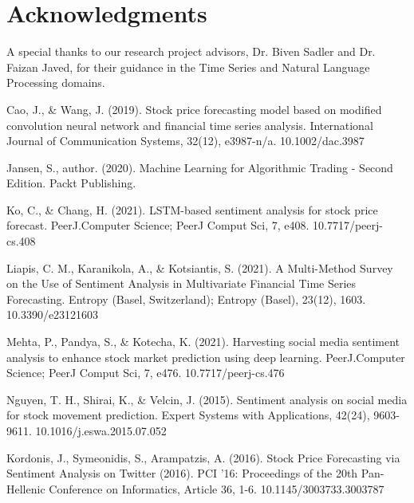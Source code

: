 \documentclass{llncs}
\begin{document}
\section{Acknowledgments}

A special thanks to our research project advisors, Dr. Biven Sadler and Dr. Faizan Javed, for their guidance in the Time Series and Natural Language Processing domains.


%
%
%
% 
% 
%

\newpage

\begin{thebibliography}{8}

\label{ref_article1} 
Cao, J., \& Wang, J. (2019). Stock price forecasting model based on modified convolution neural network and financial time series analysis. International Journal of Communication Systems, 32(12), e3987-n/a. 10.1002/dac.3987

\label{ref_article2} 
Jansen, S., author. (2020). Machine Learning for Algorithmic Trading - Second Edition. Packt Publishing.

\label{ref_article3} 
Ko, C., \& Chang, H. (2021). LSTM-based sentiment analysis for stock price forecast. PeerJ.Computer Science; PeerJ Comput Sci, 7, e408. 10.7717/peerj-cs.408

\label{ref_article4} 
Liapis, C. M., Karanikola, A., \& Kotsiantis, S. (2021). A Multi-Method Survey on the Use of Sentiment Analysis in Multivariate Financial Time Series Forecasting. Entropy (Basel, Switzerland); Entropy (Basel), 23(12), 1603. 10.3390/e23121603

\label{ref_article5} 
Mehta, P., Pandya, S., \& Kotecha, K. (2021). Harvesting social media sentiment analysis to enhance stock market prediction using deep learning. PeerJ.Computer Science; PeerJ Comput Sci, 7, e476. 10.7717/peerj-cs.476

\label{ref_article6} 
Nguyen, T. H., Shirai, K., \& Velcin, J. (2015). Sentiment analysis on social media for stock movement prediction. Expert Systems with Applications, 42(24), 9603-9611. 10.1016/j.eswa.2015.07.052

\label{ref_article7} 
Kordonis, J., Symeonidis, S., Arampatzis, A. (2016). Stock Price Forecasting via Sentiment Analysis on Twitter (2016). PCI ’16: Proceedings of the 20th Pan-Hellenic Conference on Informatics, Article 36, 1-6. 10.1145/3003733.3003787


\end{thebibliography}
\end{document}
